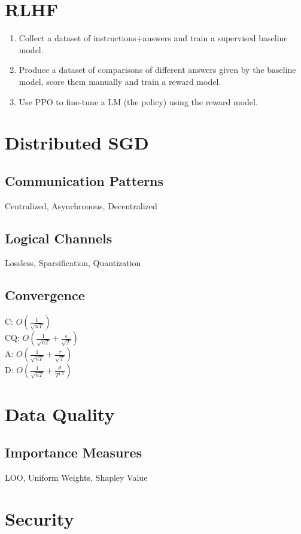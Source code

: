\section{RLHF}
\begin{enumerate}[leftmargin=*]
      \item Collect a dataset of instructions+answers and train a supervised baseline model.
      \item Produce a dataset of comparisons of different answers given by the baseline model, score them manually and train a reward model.
      \item Use PPO to fine-tune a LM (the policy) using the reward model.
\end{enumerate}

\section{Distributed SGD}
\subsection*{Communication Patterns}
Centralized, Asynchronous, Decentralized

\subsection*{Logical Channels}
Lossless, Sparsification, Quantization

\subsection*{Convergence}
C: $O(\frac{1}{\sqrt{nT}})$\\
CQ: $O(\frac{1}{\sqrt{nT}}+\frac{\epsilon}{\sqrt{T}})$\\
A: $O(\frac{1}{\sqrt{nT}}+\frac{\tau}{\sqrt{T}})$\\
D: $O(\frac{1}{\sqrt{nT}}+\frac{\rho}{{T}^{1.5}})$

\section{Data Quality}
\subsection*{Importance Measures}
LOO, Uniform Weights, Shapley Value

\section{Security}
